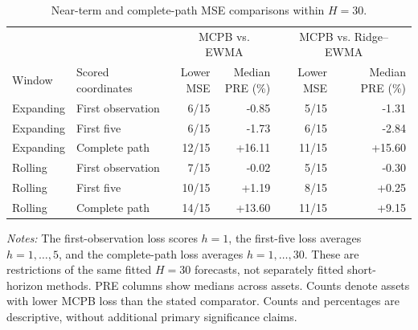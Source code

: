 \begin{table}[!htbp]
\centering\small
\setlength{\tabcolsep}{4pt}
\renewcommand{\arraystretch}{1.12}
\caption{Near-term and complete-path MSE comparisons within $H=30$.}
\label{tab:short_horizons}
\begin{tabular}{llrrrr}
\toprule
 & & \multicolumn{2}{c}{MCPB vs. EWMA} & \multicolumn{2}{c}{MCPB vs. Ridge--EWMA} \\
\cmidrule(lr){3-4}\cmidrule(lr){5-6}
Window & Scored coordinates & \shortstack{Lower\\MSE} & \shortstack{Median\\PRE (\%)} & \shortstack{Lower\\MSE} & \shortstack{Median\\PRE (\%)} \\
\midrule
Expanding & First observation & 6/15 & -0.85 & 5/15 & -1.31 \\
Expanding & First five & 6/15 & -1.73 & 6/15 & -2.84 \\
Expanding & Complete path & 12/15 & +16.11 & 11/15 & +15.60 \\
Rolling & First observation & 7/15 & -0.02 & 5/15 & -0.30 \\
Rolling & First five & 10/15 & +1.19 & 8/15 & +0.25 \\
Rolling & Complete path & 14/15 & +13.60 & 11/15 & +9.15 \\
\bottomrule
\end{tabular}
\par\smallskip
\begin{minipage}{0.98\linewidth}\footnotesize
\textit{Notes:} The first-observation loss scores $h=1$, the first-five loss averages $h=1,\ldots,5$, and the complete-path loss averages $h=1,\ldots,30$. These are restrictions of the same fitted $H=30$ forecasts, not separately fitted short-horizon methods. PRE columns show medians across assets. Counts denote assets with lower MCPB loss than the stated comparator. Counts and percentages are descriptive, without additional primary significance claims.
\end{minipage}
\end{table}
